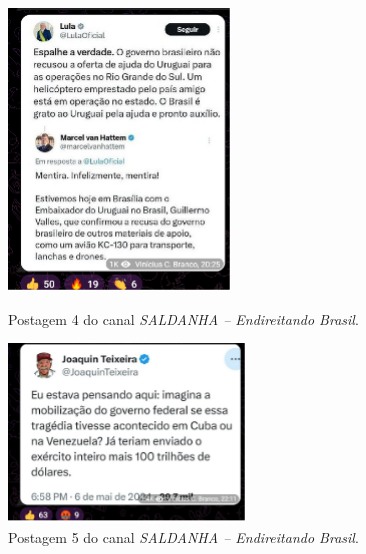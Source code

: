 \documentclass[portuguese]{textolivre}
\begin{document}
\begin{figure}[h!]
    \begin{minipage}[t]{0.25\textwidth}
        \centering
        \includegraphics[width=\linewidth]{Imagens/Fig36.png}
        \caption{Postagem 4 do canal \emph{SALDANHA -- Endireitando Brasil}.}
        \label{fig-36}
    \end{minipage}
    \hfill
    \begin{minipage}[t]{0.35\textwidth}
        \centering
        \includegraphics[width=\linewidth]{Imagens/Fig37.png}
        \caption{Postagem 5 do canal \emph{SALDANHA -- Endireitando Brasil}.}
        \label{fig-37}
    \end{minipage}
\end{figure}
\end{document}
